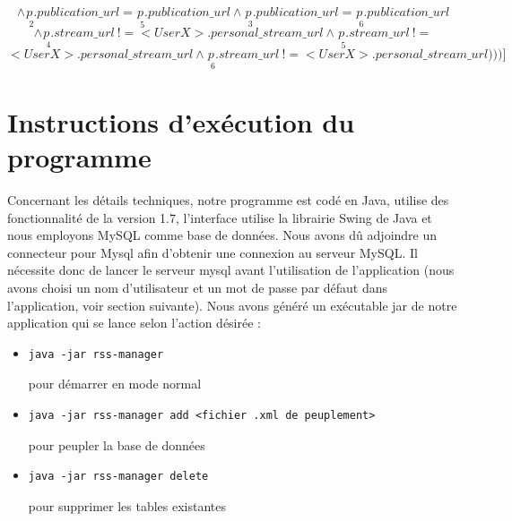 \documentclass[a4paper,10pt]{article}
\begin{document}
\begin{enumerate}
{\begin{minipage}{1.0\textwidth}
		\begin{equation}
		\wedge \underset{\ \ 2}{p}.publication\_url =  \underset{\ \ 5}{p}.publication\_url \wedge \underset{\ \ 3}{p}.publication\_url =  \underset{\ \ 6}{p}.publication\_url 
		\end{equation}
		\begin{equation}
		\wedge \underset{\ \ 4}{p}.stream\_url  \ !=  <User X>.personal\_stream\_url \wedge \underset{\ \ 5}{p}.stream\_url  \ !=  
		\end{equation}
		\begin{equation}
		<User X>.personal\_stream\_url \wedge \underset{\ \ 6}{p}.stream\_url  \ !=  <User X>.personal\_stream\_url)))]
		\end{equation}
         \end{minipage}}
	\end{enumerate}

\section{Instructions d'exécution du programme}

Concernant les détails techniques, notre programme est codé en Java, utilise des fonctionnalité de la version 1.7, l'interface utilise la librairie Swing de Java et nous employons MySQL comme base de données. Nous avons dû adjoindre un connecteur pour Mysql afin d'obtenir une connexion au serveur MySQL. Il nécessite donc de lancer le serveur mysql avant l'utilisation de l'application (nous avons choisi un nom d'utilisateur et un mot de passe par défaut dans l'application, voir section suivante). Nous avons généré un exécutable jar de notre application qui se lance selon l'action désirée :

\begin{itemize}
\item \begin{verbatim}
java -jar rss-manager
\end{verbatim}
pour démarrer en mode normal
\item \begin{verbatim}
java -jar rss-manager add <fichier .xml de peuplement>
\end{verbatim}
pour peupler la base de données
\item \begin{verbatim}
java -jar rss-manager delete
\end{verbatim}
pour supprimer les tables existantes
\end{itemize}
\end{document}
